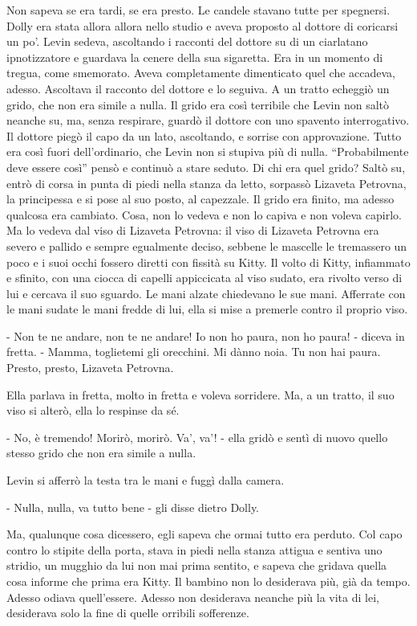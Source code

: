 Non sapeva se era tardi, se era presto. Le candele stavano tutte per spegnersi. Dolly era stata allora allora nello studio e aveva proposto al dottore di coricarsi un po'. Levin sedeva, ascoltando i racconti del dottore su di un ciarlatano ipnotizzatore e guardava la cenere della sua sigaretta. Era in un momento di tregua, come smemorato. Aveva completamente dimenticato quel che accadeva, adesso. Ascoltava il racconto del dottore e lo seguiva. A un tratto echeggiò un grido, che non era simile a nulla. Il grido era così terribile che Levin non saltò neanche su, ma, senza respirare, guardò il dottore con uno spavento interrogativo. Il dottore piegò il capo da un lato, ascoltando, e sorrise con approvazione. Tutto era così fuori dell'ordinario, che Levin non si stupiva più di nulla. ``Probabilmente deve essere così'' pensò e continuò a stare seduto. Di chi era quel grido? Saltò su, entrò di corsa in punta di piedi nella stanza da letto, sorpassò Lizaveta Petrovna, la principessa e si pose al suo posto, al capezzale. Il grido era finito, ma adesso qualcosa era cambiato. Cosa, non lo vedeva e non lo capiva e non voleva capirlo. Ma lo vedeva dal viso di Lizaveta Petrovna: il viso di Lizaveta Petrovna era severo e pallido e sempre egualmente deciso, sebbene le mascelle le tremassero un poco e i suoi occhi fossero diretti con fissità su Kitty. Il volto di Kitty, infiammato e sfinito, con una ciocca di capelli appiccicata al viso sudato, era rivolto verso di lui e cercava il suo sguardo. Le mani alzate chiedevano le sue mani. Afferrate con le mani sudate le mani fredde di lui, ella si mise a premerle contro il proprio viso. 

- Non te ne andare, non te ne andare! Io non ho paura, non ho paura! - diceva in fretta. - Mamma, toglietemi gli orecchini. Mi dànno noia. Tu non hai paura. Presto, presto, Lizaveta Petrovna. 

Ella parlava in fretta, molto in fretta e voleva sorridere. Ma, a un tratto, il suo viso si alterò, ella lo respinse da sé. 

- No, è tremendo! Morirò, morirò. Va', va'! - ella gridò e sentì di nuovo quello stesso grido che non era simile a nulla. 

Levin si afferrò la testa tra le mani e fuggì dalla camera. 

- Nulla, nulla, va tutto bene - gli disse dietro Dolly. 

Ma, qualunque cosa dicessero, egli sapeva che ormai tutto era perduto. Col capo contro lo stipite della porta, stava in piedi nella stanza attigua e sentiva uno stridio, un mugghio da lui non mai prima sentito, e sapeva che gridava quella cosa informe che prima era Kitty. Il bambino non lo desiderava più, già da tempo. Adesso odiava quell'essere. Adesso non desiderava neanche più la vita di lei, desiderava solo la fine di quelle orribili sofferenze. 

